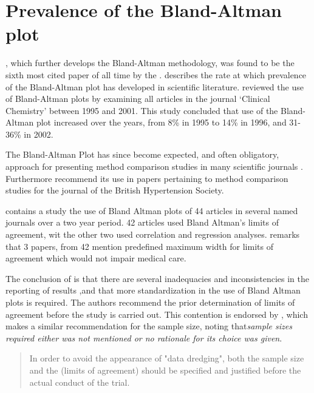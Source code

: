 \documentclass[12pt, a4paper]{report}
\theoremstyle{plain}
\theoremstyle{definition}
\theoremstyle{remark}
\begin{document}
	
	

\section{Prevalence of the Bland-Altman plot}

\citet*{BA86}, which further develops the Bland-Altman methodology,
was found to be the sixth most cited paper of all time by the
\citet{BAcite}. \cite{Dewitte} describes the rate at which
	prevalence of the Bland-Altman plot has developed in scientific
	literature. \citet{Dewitte} reviewed the use of Bland-Altman plots
	by examining all articles in the journal `Clinical Chemistry'
	between 1995 and 2001. This study concluded that use of the
	Bland-Altman plot increased over the years, from 8\% in 1995 to
	14\% in 1996, and 31-36\% in 2002.
	
	The Bland-Altman Plot has since become expected, and
	often obligatory, approach for presenting method comparison
	studies in many scientific journals \citep{hollis}. Furthermore
	\citet{BritHypSoc} recommend its use in papers pertaining to
	method comparison studies for the journal of the British
	Hypertension Society.
	

	\citet{mantha} contains a study the use of Bland Altman plots of
	44 articles in several named journals over a two year period. 42
	articles used Bland Altman's limits of agreement, wit the other
	two used correlation and regression analyses. \citet{mantha}
	remarks that 3 papers, from 42 mention predefined maximum width
	for limits of agreement which would not impair medical care.
	
	The conclusion of \citet{mantha} is that there are several
	inadequacies and inconsistencies in the reporting of results ,and
	that more standardization in the use of Bland Altman plots is
	required. The authors recommend the prior determination of limits
	of agreement before the study is carried out. This contention is
	endorsed by \citet{lin}, which makes a similar recommendation for
	the sample size, noting that\emph{sample sizes required either was
		not mentioned or no rationale for its choice was given}.
	
	\begin{quote}
		In order to avoid the appearance of "data dredging", both the
		sample size and the (limits of agreement) should be specified and
		justified before the actual conduct of the trial. \citep{lin}
	\end{quote}
	
\end{document}
